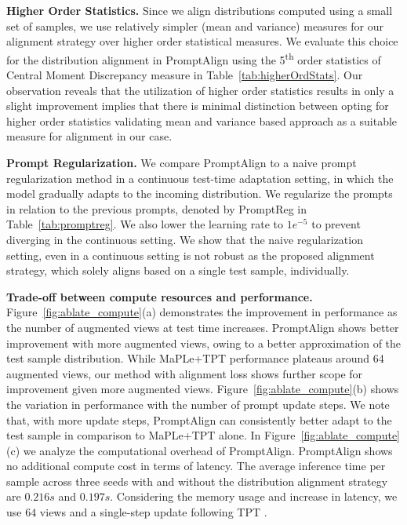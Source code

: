 \documentclass[a4paper]{article}
\begin{document}
\textbf{Higher Order Statistics.}
Since we align distributions computed using a small set of samples, we use relatively simpler (mean and variance) measures for our alignment strategy over higher order statistical measures. We evaluate this choice for the distribution alignment in PromptAlign using the 5\textsuperscript{th} order statistics of Central Moment Discrepancy measure \cite{zellinger2017central} in Table~\ref{tab:higherOrdStats}. Our observation reveals that the utilization of higher order statistics results in only a slight improvement implies that there is minimal distinction between opting for higher order statistics validating mean and variance based approach as a suitable measure for alignment in our case.

\textbf{Prompt Regularization.} We compare PromptAlign to a naive prompt regularization method in a continuous test-time adaptation setting, in which the model gradually adapts to the incoming distribution. We regularize the prompts in relation to the previous prompts, denoted by PromptReg in Table~\ref{tab:promptreg}. We also lower the learning rate to $1e^{-5}$ to prevent diverging in the continuous setting. We show that the naive regularization setting, even in a continuous setting is not robust as the proposed alignment strategy, which solely aligns based on a single test sample, individually.
\vspace{-1em}



\textbf{Trade-off between compute resources and performance.} 
Figure~\ref{fig:ablate_compute}(a) demonstrates the improvement in performance as the number of augmented views at test time increases. PromptAlign shows better improvement with more augmented views, owing to a better approximation of the test sample distribution. While MaPLe+TPT performance plateaus around 64 augmented views, our method with alignment loss shows further scope for improvement given more augmented views. Figure~\ref{fig:ablate_compute}(b) shows the variation in performance with the number of prompt update steps. We note that, with more update steps, PromptAlign can consistently better adapt to the test sample in comparison to MaPLe+TPT alone. In Figure~\ref{fig:ablate_compute}(c) we analyze the computational overhead of PromptAlign. PromptAlign shows no additional compute cost in terms of latency. The average inference time per sample across three seeds with and without the distribution alignment strategy are $0.216s$ and $0.197s$. Considering the memory usage and increase in latency, we use $64$ views and a single-step update following TPT \cite{shu2022test}.
\end{document}
